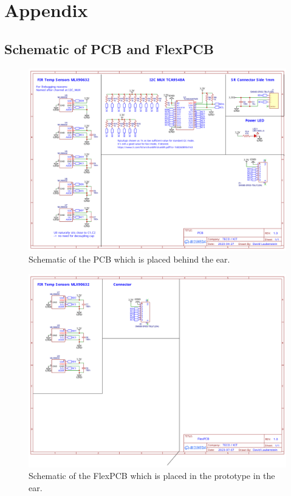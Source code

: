 \chapter{Appendix}

\section{Schematic of PCB and FlexPCB}

\begin{figure}
    \centering
    \includegraphics[width=\textwidth]{thesis-doc/images/prototype/schematic/Schematic_Open Earable 1.3 - I2C PCB David_2023-10-17.pdf}
    \caption{Schematic of the PCB which is placed behind the ear.}    
    \label{fig:appendix:schematic_pcb}
\end{figure} 

\begin{figure}
    \centering
    \includegraphics[width=\textwidth]{thesis-doc/images/prototype/schematic/Schematic_Open Earable 1.3 - I2C FlexPCB David_2023-10-17.pdf}
    \caption{Schematic of the FlexPCB which is placed in the prototype in the ear.}    
    \label{fig:appendix:schematic_pcb}
\end{figure} 